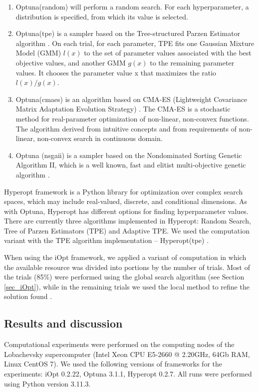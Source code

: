 \documentclass[iicol]{sn-jnl}
\theoremstyle{thmstyleone}%
\theoremstyle{thmstyletwo}%
\theoremstyle{thmstylethree}%
\begin{document}
\begin{enumerate}
	\item Optuna(random) will perform a random search. For each hyperparameter, a distribution is specified, from which its value is selected.
	\item Optuna(tpe) is a sampler based on the Tree-structured Parzen Estimator algorithm \citep{NIPS2011}. On each trial, for each parameter, TPE fits one Gaussian Mixture Model (GMM) $l(x)$ to the set of parameter values associated with the best objective values, and another GMM $g(x)$ to the remaining parameter values. It chooses the parameter value x that maximizes the ratio $l(x)/g(x)$.
	\item Optuna(cmaes) is an algorithm based on CMA-ES (Lightweight Covariance Matrix Adaptation Evolution Strategy) \citep{cmaes2015}. The CMA-ES is a stochastic method for real-parameter optimization of non-linear, non-convex functions. The algorithm derived from intuitive concepts and from requirements of non-linear, non-convex search in continuous domain.
	\item Optuna (nsgaii) is a sampler based on the Nondominated Sorting Genetic Algorithm II,  which is a well known, fast and elitist multi-objective genetic algorithm \citep{nsgaii2013}.
\end{enumerate}

Hyperopt framework is a Python library for optimization over complex search spaces, which may include real-valued, discrete, and conditional dimensions. As with Optuna, Hyperopt has different options for finding hyperparameter values. There are currently three algorithms implemented in Hyperopt: Random Search, Tree of Parzen Estimators (TPE) and Adaptive TPE. We used the computation variant with the TPE algorithm implementation -- Hyperopt(tpe) \citep{NIPS2011}.

When using the iOpt framework, we applied a variant of computation in which the available resource was divided into portions by the number of trials. Most of the trials (85\%) were performed using the global search algorithm (see Section \ref{sec_iOpt}), while in the remaining trials we used the local method to refine the solution found \citep{Kelley}.

\subsection{Results and discussion}

Computational experiments were performed on the computing nodes of the Lobachevsky supercomputer (Intel Xeon CPU E5-2660 @ 2.20GHz, 64Gb RAM, Linux CentOS 7). We used the following versions of frameworks for the experiments: iOpt 0.2.22, Optuna 3.1.1, Hyperopt 0.2.7. All runs were performed using Python version 3.11.3.
\end{document}
